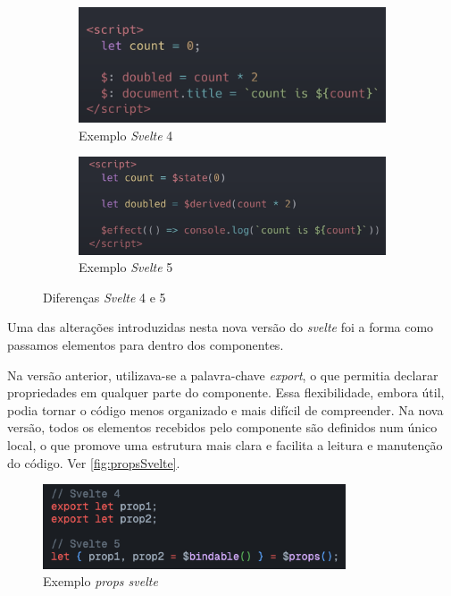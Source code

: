 \begin{figure}[!h]
	\centering
	\begin{subfigure}[c]{0.45\textwidth}
		\centering
		\includegraphics[width=\textwidth]{figs/svelte4.png}
		\caption{Exemplo \textit{Svelte} 4}
		\label{fig:svelte4}
	\end{subfigure}
	\hfill
	\begin{subfigure}[c]{0.45\textwidth}
		\centering
		\includegraphics[width=\textwidth]{figs/svelte5.png}
		\caption{Exemplo \textit{Svelte} 5}
		\label{fig:svelte5}
	\end{subfigure}
	\caption{Diferenças \textit{Svelte} 4 e 5}
\end{figure}

Uma das alterações introduzidas nesta nova versão do \textit{svelte} foi a forma como passamos elementos para dentro dos componentes. 

Na versão anterior, utilizava-se a palavra-chave \textit{export}, o que permitia declarar propriedades em qualquer parte do componente. Essa flexibilidade, embora útil, podia tornar o código menos organizado e mais difícil de compreender. Na nova versão, todos os elementos recebidos pelo componente são definidos num único local, o que promove uma estrutura mais clara e facilita a leitura e manutenção do código. Ver \autoref{fig:propsSvelte}.

\begin{figure}[h!]
    \centering
    \includegraphics[width=0.8\textwidth]{figs/props.png}
    \caption{Exemplo \textit{props svelte}}
    \label{fig:propsSvelte}
\end{figure}

